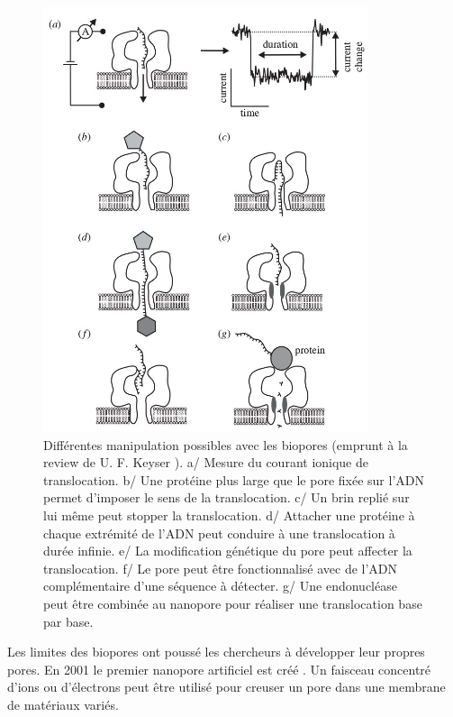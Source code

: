 \begin{figure}[h!]
\begin{center}
\includegraphics[width=0.85\textwidth]{bionanopore.jpg}


\caption[Manipulation sur biopores]{Différentes manipulation possibles avec les biopores (emprunt à la review de U. F. Keyser \cite{keyser}). a/ Mesure du courant ionique de translocation. b/ Une protéine plus large que le pore fixée sur l'ADN permet d'imposer le sens de la translocation. c/ Un brin replié sur lui même peut stopper la translocation. d/ Attacher une protéine à chaque extrémité de l'ADN peut conduire à une translocation à durée infinie. e/ La modification génétique du pore peut affecter la translocation. f/ Le pore peut être fonctionnalisé avec de l'ADN complémentaire d'une séquence à détecter. g/ Une endonucléase peut être combinée au nanopore pour réaliser une translocation base par base.}
\label{bioporepossib}
\end{center}
\end{figure}



Les limites des biopores ont poussé les chercheurs à développer leur propres pores. En 2001 le premier nanopore artificiel est créé \cite{Li2001}. Un faisceau concentré d'ions ou d'électrons peut être utilisé pour creuser un pore dans une membrane de matériaux variés\cite{Wanunu2010}.

